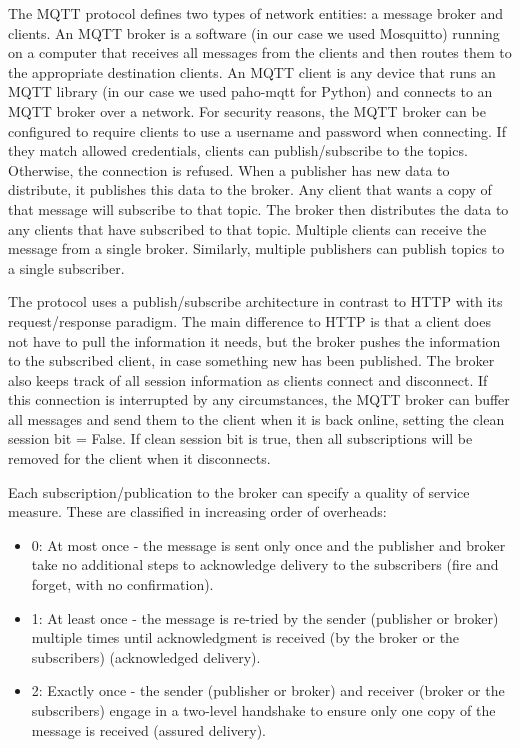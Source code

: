 The MQTT protocol defines two types of network entities: a message broker and clients. An MQTT broker is a software (in our case we used Mosquitto) running on a computer that receives all messages from the clients and then routes them to the appropriate destination clients. An MQTT client is any device that runs an MQTT library (in our case we used paho-mqtt for Python) and connects to an MQTT broker over a network.
For security reasons, the MQTT broker can be configured to require clients to use a username and password when connecting. If they match allowed credentials, clients can publish/subscribe to the topics. Otherwise, the connection is refused.
When a publisher has new data to distribute, it publishes this data to the broker. Any client that wants a copy of that message will subscribe to that topic. The broker then distributes the data to any clients that have subscribed to that topic. Multiple clients can receive the message from a single broker. Similarly, multiple publishers can publish topics to a single subscriber.

The protocol uses a publish/subscribe architecture in contrast to HTTP with its request/response paradigm. The main difference to HTTP is that a client does not have to pull the information it needs, but the broker pushes the information to the subscribed client, in case something new has been published. The broker also keeps track of all session information as clients connect and disconnect. If this connection is interrupted by any circumstances, the MQTT broker can buffer all messages and send them to the client when it is back online, setting the clean session bit = False. If clean session bit is true, then all subscriptions will be removed for the client when it disconnects.

Each subscription/publication to the broker can specify a quality of service measure. These are classified in increasing order of overheads:
\begin{itemize}
  \item 0: At most once - the message is sent only once and the publisher and broker take no additional steps to acknowledge delivery to the subscribers (fire and forget, with no confirmation).
  \item 1: At least once - the message is re-tried by the sender (publisher or broker) multiple times until acknowledgment is received (by the broker or the subscribers) (acknowledged delivery).
  \item 2: Exactly once - the sender (publisher or broker) and receiver (broker or the subscribers) engage in a two-level handshake to ensure only one copy of the message is received (assured delivery).
\end{itemize}

